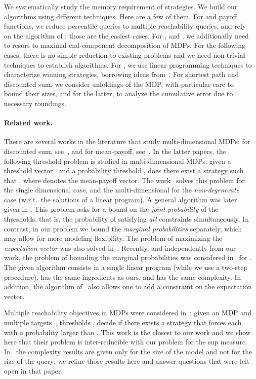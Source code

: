 \documentclass{llncs}
\begin{document}
We systematically study the memory requirement of strategies. We build our
algorithms using different techniques. Here are a few of them. For  and
 payoff functions, we reduce percentile queries to multiple reachability
queries, and rely on the algorithm of \cite{EKVY-lmcs08}: those are the
easiest cases. For ,  and , we additionally need to
resort to maximal end-component decomposition of MDPs. For the following cases,
there is no simple reduction to existing problems and we need non-trivial
techniques to establish algorithms.
For , we use linear programming techniques to characterize winning strategies, borrowing ideas from~\cite{EKVY-lmcs08,BBCFK-lmcs14}. For shortest path and discounted sum, we consider unfoldings of the MDP, with particular care to bound their sizes, and for the latter, to analyze the cumulative error due to necessary roundings.

\paragraph{{\bf Related work.}}
There are several works in the literature that study multi-dimensional MDPs: for discounted sum, see~\cite{CMH-stacs06}, and for mean-payoff, see~\cite{BBCFK-lmcs14,FKR-ieee95}.
In the latter papers, 
the following threshold problem is studied in multi-dimensional MDPs: given a threshold vector~ and a probability threshold , does there exist a strategy  such that , where  denotes the mean-payoff vector.
The work~\cite{FKR-ieee95} solves this problem for the single dimensional case, and the multi-dimensional for the \emph{non-degenerate} case (w.r.t.~the solutions of a linear program). 
A general algorithm was later given in \cite{BBCFK-lmcs14}.
This problem asks for a bound on the \emph{joint probability} of the thresholds, that is, the probability of satisfying \emph{all} constraints simultaneously. In contrast,
in our problem we bound the \emph{marginal probabilities} separately, which may allow for more modeling flexibility.
The problem of maximizing the \emph{expectation vector} was also solved in~\cite{BBCFK-lmcs14}. Recently, and independently from our work, the problem of bounding the marginal probabilities was considered in~\cite{CKK-lics15} for .
The given algorithm consists in a single linear program
(while we use a two-step procedure), has the same ingredients as ours, and has the same complexity. In addition, the algorithm of~\cite{CKK-lics15} also allows one to add
a constraint on the expectation vector.

Multiple reachability objectives in MDPs were considered in~\cite{EKVY-lmcs08}: given an MDP and multiple targets~, thresholds , decide if there exists a strategy that forces each  with a probability larger than . This work is the closest to our work and we show here that their problem is inter-reducible with our problem for the sup measure. In~\cite{EKVY-lmcs08} the complexity results are given only for the size of the model and not for the size of the query: we refine those results here and answer questions that were left open in that paper.
\end{document}
